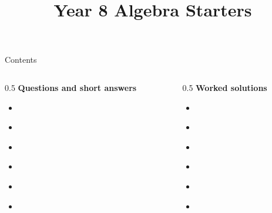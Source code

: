 \documentclass{beamer}
\title{Year 8 Algebra Starters}
\date{}
\begin{document}
\frame{\titlepage}

\begin{frame}{Contents}
\small
\begin{columns}[T]
\begin{column}{0.5\textwidth}
\textbf{Questions and short answers}
\begin{itemize}
  \item \hyperlink{q-st1}{}
  \item \hyperlink{q-st2}{}
  \item \hyperlink{q-st3}{}
  \item \hyperlink{q-st4}{}
  \item \hyperlink{q-st5}{}
  \item \hyperlink{q-st6}{}
\end{itemize}
\end{column}
\begin{column}{0.5\textwidth}
\textbf{Worked solutions}
\begin{itemize}
  \item \hyperlink{work-st1}{}
  \item \hyperlink{work-st2}{}
  \item \hyperlink{work-st3}{}
  \item \hyperlink{work-st4}{}
  \item \hyperlink{work-st5}{}
  \item \hyperlink{work-st6}{}
\end{itemize}
\end{column}
\end{columns}
\end{frame}
\end{document}
